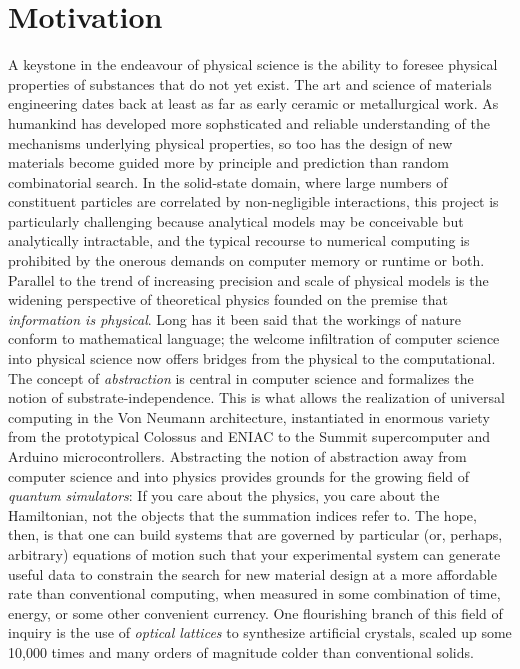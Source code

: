\section{Motivation}
	A keystone in the endeavour of physical science is the ability to foresee physical properties of substances that do not yet exist.
	The art and science of materials engineering dates back at least as far as early ceramic or metallurgical work.
	As humankind has developed more sophsticated and reliable understanding of the mechanisms underlying physical properties, so too has the design of new materials become guided more by principle and prediction than random combinatorial search.
	In the solid-state domain, where large numbers of constituent particles are correlated by non-negligible interactions, this project is particularly challenging because analytical models may be conceivable but analytically intractable, and the typical recourse to numerical computing is prohibited by the onerous demands on computer memory or runtime or both.
	Parallel to the trend of increasing precision and scale of physical models is the widening perspective of theoretical physics founded on the premise that \emph{information is physical}.
	Long has it been said that the workings of nature conform to mathematical language; the welcome infiltration of computer science into physical science now offers bridges from the physical to the computational.
	The concept of \emph{abstraction} is central in computer science and formalizes the notion of substrate-independence.
	This is what allows the realization of universal computing in the Von Neumann architecture, instantiated in enormous variety from the prototypical Colossus and ENIAC to the Summit supercomputer and Arduino microcontrollers.
	Abstracting the notion of abstraction away from computer science and into physics provides grounds for the growing field of \emph{quantum simulators}: If you care about the physics, you care about the Hamiltonian, not the objects that the summation indices refer to.
	The hope, then, is that one can build systems that are governed by  particular (or, perhaps, arbitrary) equations of motion such that your experimental system can generate useful data to constrain the search for new material design at a more affordable rate than conventional computing, when measured in some combination of time, energy, or some other convenient currency.
	One flourishing branch of this field of inquiry is the use of \emph{optical lattices} to synthesize artificial crystals, scaled up some 10,000 times and many orders of magnitude colder than conventional solids.
